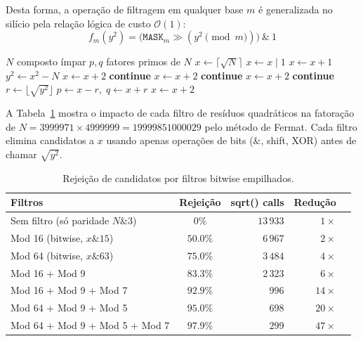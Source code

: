 \documentclass[12pt,a4paper]{article}
\theoremstyle{plain}
\begin{document}
Desta forma, a operação de filtragem em qualquer base $m$ é
generalizada no silício pela relação lógica de custo $\mathcal{O}(1)$:
\[
f_m(y^2) = \bigl( \mathtt{MASK}_m \gg (y^2 \pmod m) \bigr) \ \& \ 1
\]

\begin{algorithm}[H]
\caption{Fatoração de Fermat com filtros bitwise empilhados}
\label{alg:fermat_bitwise}
\begin{algorithmic}[1]
\Require $N$ composto ímpar
\Ensure $p,q$ fatores primos de $N$
\State $x \gets \lceil\sqrt{N}\rceil$
    \State $x \gets x \mid 1$ 
  \EndIf
\Else
    \State $x \gets x + 1$ 
  \EndIf
\EndIf
\Loop
  \State $y^2 \gets x^2 - N$
    \State $x \gets x + 2$ 
    \State \textbf{continue}
  \EndIf
    \State $x \gets x + 2$ 
    \State \textbf{continue}
  \EndIf
    \State $x \gets x + 2$ 
    \State \textbf{continue}
  \EndIf
  \State $r \gets \lfloor\sqrt{y^2}\rfloor$ 
    \State \Return $p \gets x - r,\; q \gets x + r$
  \EndIf
  \State $x \gets x + 2$
\EndLoop
\end{algorithmic}
\end{algorithm}

A Tabela~\ref{tab:filtros} mostra o impacto de cada filtro de resíduos
quadráticos na fatoração de $N = 3999971 \times 4999999 = 19999851000029$
pelo método de Fermat. Cada filtro elimina candidatos a $x$ usando
apenas operações de bits ($\&$, shift, XOR) antes de chamar
$\sqrt{y^2}$.

\begin{table}[htbp]
\centering
\caption{Rejeição de candidatos por filtros bitwise empilhados.}
\label{tab:filtros}
\begin{tabular}{lcrrr}
\hline
Filtros & Rejeição & sqrt() calls & Redução \\
\hline
Sem filtro (só paridade $N\&3$) & $0\%$ & $13\,933$ & $1\times$ \\
Mod 16 (bitwise, $x\&15$) & $50.0\%$ & $6\,967$ & $2\times$ \\
Mod 64 (bitwise, $x\&63$) & $75.0\%$ & $3\,484$ & $4\times$ \\
Mod 16 + Mod 9 & $83.3\%$ & $2\,323$ & $6\times$ \\
Mod 16 + Mod 9 + Mod 7 & $92.9\%$ & $996$ & $14\times$ \\
Mod 64 + Mod 9 + Mod 5 & $95.0\%$ & $698$ & $20\times$ \\
Mod 64 + Mod 9 + Mod 5 + Mod 7 & $97.9\%$ & $299$ & $47\times$ \\
\hline
\end{tabular}
\end{table}
\end{document}
